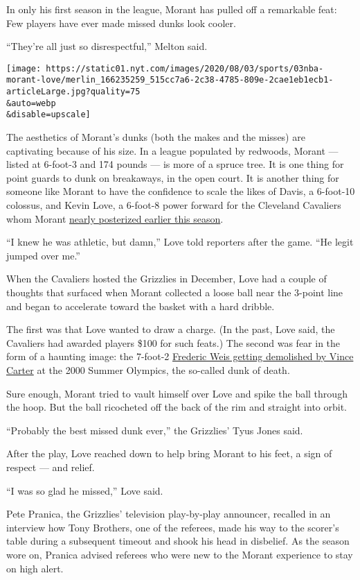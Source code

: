 In only his first season in the league, Morant has pulled off a
remarkable feat: Few players have ever made missed dunks look cooler.

``They're all just so disrespectful,'' Melton said.

\texttt{[image: https://static01.nyt.com/images/2020/08/03/sports/03nba-morant-love/merlin\_166235259\_515cc7a6-2c38-4785-809e-2cae1eb1ecb1-articleLarge.jpg?quality=75\\\&auto=webp\\\&disable=upscale]}

The aesthetics of Morant's dunks (both the makes and the misses) are
captivating because of his size. In a league populated by redwoods,
Morant --- listed at 6-foot-3 and 174 pounds --- is more of a spruce
tree. It is one thing for point guards to dunk on breakaways, in the
open court. It is another thing for someone like Morant to have the
confidence to scale the likes of Davis, a 6-foot-10 colossus, and Kevin
Love, a 6-foot-8 power forward for the Cleveland Cavaliers whom Morant
\href{https://www.youtube.com/watch?v=SJvHeuCLJAs}{nearly posterized
earlier this season}.

``I knew he was athletic, but damn,'' Love told reporters after the
game. ``He legit jumped over me.''

When the Cavaliers hosted the Grizzlies in December, Love had a couple
of thoughts that surfaced when Morant collected a loose ball near the
3-point line and began to accelerate toward the basket with a hard
dribble.

The first was that Love wanted to draw a charge. (In the past, Love
said, the Cavaliers had awarded players \$100 for such feats.) The
second was fear in the form of a haunting image: the 7-foot-2
\href{https://www.youtube.com/watch?v=k_uZeCymShQ}{Frederic Weis getting
demolished by Vince Carter} at the 2000 Summer Olympics, the so-called
dunk of death.

Sure enough, Morant tried to vault himself over Love and spike the ball
through the hoop. But the ball ricocheted off the back of the rim and
straight into orbit.

``Probably the best missed dunk ever,'' the Grizzlies' Tyus Jones said.

After the play, Love reached down to help bring Morant to his feet, a
sign of respect --- and relief.

``I was so glad he missed,'' Love said.

Pete Pranica, the Grizzlies' television play-by-play announcer, recalled
in an interview how Tony Brothers, one of the referees, made his way to
the scorer's table during a subsequent timeout and shook his head in
disbelief. As the season wore on, Pranica advised referees who were new
to the Morant experience to stay on high alert.

